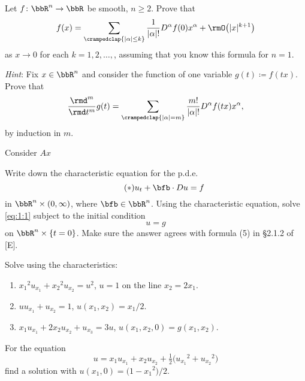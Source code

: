 \begin{problem}
  Let \(f\colon\bbR^n\to\bbR\) be smooth, \(n\geq 2\). Prove that
  \[
    f(x)=\sum_{\crampedclap{|\alpha|\leq k}}
    \frac{1}{|\alpha|!}D^\alpha f(0)x^\alpha+\rmO\bigl( |x|^{k+1} \bigr)
  \]
  as \(x\to 0\) for each \(k=1,2,\dotsc,\), assuming that you know this
  formula for \(n=1\).

  \emph{Hint}: Fix \(x\in\bbR^n\) and consider the function of one variable
  \(g(t)\coloneqq f(tx)\). Prove that
  \[
    \frac{\rmd^m}{\rmd t^m}g(t)
    =\sum_{\crampedclap{|\alpha|=m}}\frac{m!}{|\alpha|!} D^\alpha f(tx)x^\alpha,
  \]
  by induction in \(m\).
\end{problem}
\begin{solution}
  Consider \(Ax\) 
\end{solution}
\newpage

\begin{problem}
  Write down the characteristic equation for the p.d.e.\@
  \[
    \label{eq:1:1}
    \tag{\(*\)}
    u_t+\bfb\cdot Du=f
  \]
  in \(\bbR^n\times(0,\infty)\), where \(\bfb\in\bbR^n\). Using the
  characteristic equation, solve \eqref{eq:1:1} subject to the initial
  condition
  \[
    u=g
  \]
  on \(\bbR^n\times\{t=0\}\). Make sure the answer agrees with formula (5)
  in \S 2.1.2 of [E].
\end{problem}
\begin{solution}

\end{solution}
\newpage

\begin{problem}
  Solve using the characteristics:
  \begin{enumerate}[label=(\alph*)]
  \item \({x_1}^{\!2}u_{x_1}+{x_2}^{\!2}u_{x_2}=u^2\), \(u=1\) on the line
    \(x_2=2x_1\).
  \item \(uu_{x_1}+u_{x_2}=1\), \(u(x_1,x_2)=x_1/2\).
  \item \(x_1u_{x_1}+2x_2u_{x_2}+u_{x_3}=3u\),
    \(u(x_1,x_2,0)=g(x_1,x_2)\).
  \end{enumerate}
\end{problem}
\begin{solution}

\end{solution}
\newpage

\begin{problem}
  For the equation
  \[
    u=x_1u_{x_1}+x_2u_{x_2}+\tfrac{1}{2}\bigl({u_{x_1}}^{\!\!\!2}+{u_{x_2}}^{\!\!\!2}\bigr)
  \]
  find a solution with \(u(x_1,0)=\bigl(1-{x_1}^{\!2}\bigr)/2\).
\end{problem}
\begin{solution}

\end{solution}

